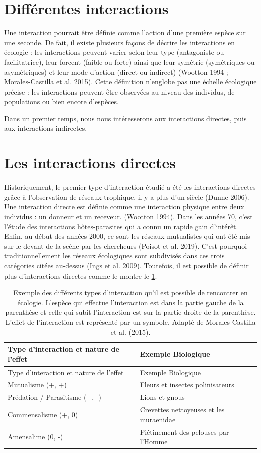 \documentclass[
  12pt,
  a4paper,
  oneside]{report}
\begin{document}
\hypertarget{diffuxe9rentes-interactions}{%
\section{Différentes interactions}\label{diffuxe9rentes-interactions}}

Une interaction pourrait être définie comme l'action d'une première
espèce sur une seconde. De fait, il existe plusieurs façons de décrire
les interactions en écologie : les interactions peuvent varier selon
leur type (antagoniste ou facilitatrice), leur forcent (faible ou forte)
ainsi que leur symétrie (symétriques ou asymétriques) et leur mode
d'action (direct ou indirect) (Wootton 1994 ; Morales-Castilla et al.
2015). Cette définition n'englobe pas une échelle écologique précise :
les interactions peuvent être observées au niveau des individus, de
populations ou bien encore d'espèces.

Dans un premier temps, nous nous intéresserons aux interactions
directes, puis aux interactions indirectes.

\hypertarget{les-interactions-directes}{%
\section{Les interactions directes}\label{les-interactions-directes}}

Historiquement, le premier type d'interaction étudié a été les
interactions directes grâce à l'observation de réseaux trophique, il y a
plus d'un siècle (Dunne 2006). Une interaction directe est définie comme
une interaction physique entre deux individus : un donneur et un
receveur. (Wootton 1994). Dans les années 70, c'est l'étude des
interactions hôtes-parasites qui a connu un rapide gain d'intérêt.
Enfin, au début des années 2000, ce sont les réseaux mutualistes qui ont
été mis sur le devant de la scène par les chercheurs (Poisot et al.
2019). C'est pourquoi traditionnellement les réseaux écologiques sont
subdivisés dans ces trois catégories citées au-dessus (Ings et al.
2009). Toutefois, il est possible de définir plus d'interactions
directes comme le montre le \cref{tbl:1}.

\begin{longtable}[]{@{}ll@{}}
\caption{Exemple des différents types d'interaction qu'il est possible
de rencontrer en écologie. L'espèce qui effectue l'interaction est dans
la partie gauche de la parenthèse et celle qui subit l'interaction est
sur la partie droite de la parenthèse. L'effet de l'interaction est
représenté par un symbole. Adapté de Morales-Castilla et al. (2015).
\label{tbl:1}}\tabularnewline
\toprule
Type d'interaction et nature de l'effet & Exemple
Biologique\tabularnewline
\midrule
\endfirsthead
\toprule
Type d'interaction et nature de l'effet & Exemple
Biologique\tabularnewline
\midrule
\endhead
Mutualisme (+, +) & Fleurs et insectes polinisateurs\tabularnewline
Prédation / Parasitisme (+, -) & Lions et gnous\tabularnewline
Commensalisme (+, 0) & Crevettes nettoyeuses et les
muraenidae\tabularnewline
Amensalime (0, -) & Piétinement des pelouses par l'Homme\tabularnewline
\bottomrule
\end{longtable}
\end{document}
